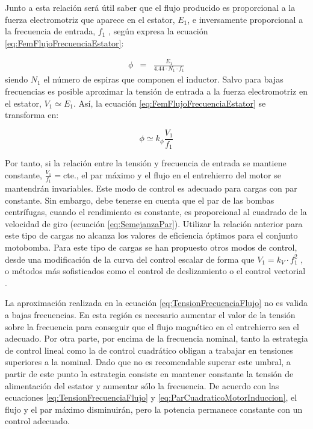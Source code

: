 Junto a esta relación será útil saber que el flujo producido es proporcional
a la fuerza electromotriz que aparece en el estator, $E_{1}$, e inversamente
proporcional a la frecuencia de entrada, $f_{1}$ , según expresa
la ecuación \ref{eq:FemFlujoFrecuenciaEstator}:

\begin{eqnarray}
\phi & = & \frac{E_{1}}{4.44\cdot N_{1}\cdot f_{1}}\label{eq:FemFlujoFrecuenciaEstator}\end{eqnarray}
siendo $N_{1}$ el número de espiras que componen el inductor. Salvo
para bajas frecuencias es posible aproximar la tensión de entrada
a la fuerza electromotriz en el estator, $V_{1}\simeq E_{1}$. Así,
la ecuación \ref{eq:FemFlujoFrecuenciaEstator} se transforma en:

\begin{equation}
\phi\simeq k_{\phi}\frac{V_{1}}{f_{1}}\label{eq:TensionFrecuenciaFlujo}\end{equation}


Por tanto, si la relación entre la tensión y frecuencia de entrada
se mantiene constante, $\frac{V_{1}}{f_{1}}=\mathrm{cte.}$, el
par máximo y el flujo en el entrehierro del motor se mantendrán invariables.
Este modo de control es adecuado para cargas con par constante. Sin
embargo, debe tenerse en cuenta que el par de las bombas centrífugas,
cuando el rendimiento es constante, es proporcional al cuadrado de
la velocidad de giro (ecuación \ref{eq:SemejanzaPar}). Utilizar la
relación anterior para este tipo de cargas no alcanza los valores
de eficiencia óptimos para el conjunto motobomba. Para este tipo de
cargas se han propuesto otros modos de control, desde una modificación
de la curva del control escalar de forma que $V_{1}=k_{V}\cdot f_{1}^{2}$
\cite{Abella.Lorenzo.ea2003,Narvarte.Lorenzo2006}, o métodos más
sofisticados como el control de deslizamiento o el control vectorial
\cite{Bose2002,Bhat.Pittet.ea1987,Correa.Nevesy.ea2008,Famouri.Cathey1991}.

La aproximación realizada en la ecuación \ref{eq:TensionFrecuenciaFlujo}
no es valida a bajas frecuencias. En esta región es necesario aumentar
el valor de la tensión sobre la frecuencia para conseguir que el flujo
magnético en el entrehierro sea el adecuado. Por otra parte, por encima
de la frecuencia nominal, tanto la estrategia de control lineal como
la de control cuadrático obligan a trabajar en tensiones superiores
a la nominal. Dado que no es recomendable superar este umbral, a partir
de este punto la estrategia consiste en mantener constante la tensión
de alimentación del estator y aumentar sólo la frecuencia. De acuerdo
con las ecuaciones \ref{eq:TensionFrecuenciaFlujo} y \ref{eq:ParCuadraticoMotorInduccion},
el flujo y el par máximo disminuirán, pero la potencia permanece constante
con un control adecuado.


